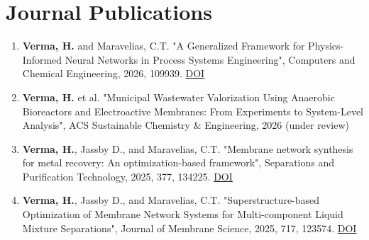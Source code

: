 \documentclass{resume}
\begin{document}

\section{\bfseries Journal Publications}
  \begin{enumerate}[leftmargin=0.25in, label={\small J\arabic*.}, itemsep=0pt, parsep=2pt]
    \small
    \item \textbf{Verma, H.} and Maravelias, C.T. "A Generalized Framework for Physics-Informed Neural Networks in Process Systems Engineering", Computers and Chemical Engineering, 2026, 109939. \href{https://doi.org/10.1016/j.compchemeng.2026.109939}{DOI}
    \item \textbf{Verma, H.} et al. "Municipal Wastewater Valorization Using Anaerobic Bioreactors and Electroactive Membranes: From Experiments to System-Level Analysis", ACS Sustainable Chemistry \& Engineering, 2026 (under review)
    \item \textbf{Verma, H.}, Jassby D., and Maravelias, C.T. "Membrane network synthesis for metal recovery: An optimization-based framework", Separations and Purification Technology, 2025, 377, 134225. \href{https://www.sciencedirect.com/science/article/abs/pii/S1383586625028229}{DOI}
    \item \textbf{Verma, H.}, Jassby D., and Maravelias, C.T. "Superstructure-based Optimization of Membrane Network Systems for Multi-component Liquid Mixture Separations", Journal of Membrane Science, 2025, 717, 123574. \href{https://www.sciencedirect.com/science/article/abs/pii/S0376738824011682}{DOI}
  \end{enumerate}

\end{document}
